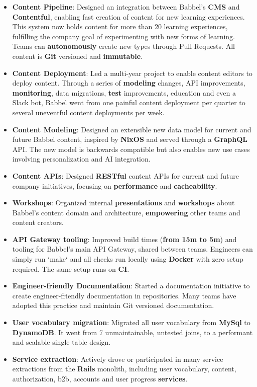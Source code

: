 \documentclass[10pt,a4paper,ragged2e,withhyper]{altacv}
\begin{document}
\begin{paracol}{2}
{\begin{itemize}
\item \textbf{Content Pipeline}: Designed an integration between Babbel's \textbf{CMS} and \textbf{Contentful}, enabling fast creation of content for new learning experiences. This system now holds content for more than 20 learning experiences, fulfilling the company goal of experimenting with new forms of learning. Teams can \textbf{autonomously} create new types through Pull Requests. All content is \textbf{Git} versioned and \textbf{immutable}.
\item \textbf{Content Deployment}: Led a multi-year project to enable content editors to deploy content. Through a series of \textbf{modeling} changes, API improvements, \textbf{monitoring}, data migrations, \textbf{test} improvements, education and even a Slack bot, Babbel went from one painful content deployment per quarter to several uneventful content deployments per week.
\item \textbf{Content Modeling}: Designed an extensible new data model for current and future Babbel content, inspired by \textbf{NixOS} and served through a \textbf{GraphQL} API. The new model is backwards compatible but also enables new use cases involving personalization and AI integration.
\item \textbf{Content APIs}: Designed \textbf{RESTful} content APIs for current and future company initiatives, focusing on \textbf{performance} and \textbf{cacheability}.
\item \textbf{Workshops}: Organized internal \textbf{presentations} and \textbf{workshops} about Babbel's content domain and architecture, \textbf{empowering} other teams and content creators.
\item \textbf{API Gateway tooling}: Improved build times (\textbf{from 15m to 5m}) and tooling for Babbel's main API Gateway, shared between teams. Engineers can simply run `make` and all checks run locally using \textbf{Docker} with zero setup required. The same setup runs on \textbf{CI}.
\item \textbf{Engineer-friendly Documentation}: Started a documentation initiative to create engineer-friendly documentation in repositories. Many teams have adopted this practice and maintain Git versioned documentation.
\item \textbf{User vocabulary migration}: Migrated all user vocabulary from \textbf{MySql} to \textbf{DynamoDB}. It went from 7 unmaintainable, untested joins, to a performant and scalable single table design.
\item \textbf{Service extraction}: Actively drove or participated in many service extractions from the \textbf{Rails} monolith, including user vocabulary, content, authorization, b2b, accounts and user progress \textbf{services}.

\end{itemize}}
\end{paracol}
\end{document}
